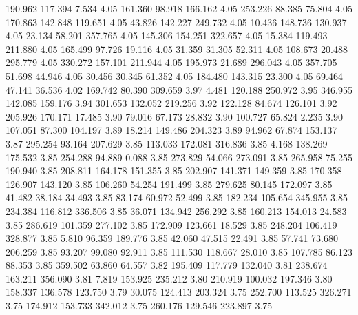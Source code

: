  190.962  117.394    7.534         4.05
 161.360   98.918  166.162         4.05
 253.226   88.385   75.804         4.05
 170.863  142.848  119.651         4.05
  43.826  142.227  249.732         4.05
  10.436  148.736  130.937         4.05
  23.134   58.201  357.765         4.05
 145.306  154.251  322.657         4.05
  15.384  119.493  211.880         4.05
 165.499   97.726   19.116         4.05
  31.359   31.305   52.311         4.05
 108.673   20.488  295.779         4.05
 330.272  157.101  211.944         4.05
 195.973   21.689  296.043         4.05
 357.705   51.698   44.946         4.05
  30.456   30.345   61.352         4.05
 184.480  143.315   23.300         4.05
  69.464   47.141   36.536         4.02
 169.742   80.390  309.659         3.97
   4.481  120.188  250.972         3.95
 346.955  142.085  159.176         3.94
 301.653  132.052  219.256         3.92
 122.128   84.674  126.101         3.92
 205.926  170.171   17.485         3.90
  79.016   67.173   28.832         3.90
 100.727   65.824    2.235         3.90
 107.051   87.300  104.197         3.89
  18.214  149.486  204.323         3.89
  94.962   67.874  153.137         3.87
 295.254   93.164  207.629         3.85
 113.033  172.081  316.836         3.85
   4.168  138.269  175.532         3.85
 254.288   94.889    0.088         3.85
 273.829   54.066  273.091         3.85
 265.958   75.255  190.940         3.85
 208.811  164.178  151.355         3.85
 202.907  141.371  149.359         3.85
 170.358  126.907  143.120         3.85
 106.260   54.254  191.499         3.85
 279.625   80.145  172.097         3.85
  41.482   38.184   34.493         3.85
  83.174   60.972   52.499         3.85
 182.234  105.654  345.955         3.85
 234.384  116.812  336.506         3.85
  36.071  134.942  256.292         3.85
 160.213  154.013   24.583         3.85
 286.619  101.359  277.102         3.85
 172.909  123.661   18.529         3.85
 248.204  106.419  328.877         3.85
   5.810   96.359  189.776         3.85
  42.060   47.515   22.491         3.85
  57.741   73.680  206.259         3.85
  93.207   99.080   92.911         3.85
 111.530  118.667   28.010         3.85
 107.785   86.123   88.353         3.85
 359.502   63.860   64.557         3.82
 195.409  117.779  132.040         3.81
 238.674  163.211  356.090         3.81
   7.819  153.925  235.212         3.80
 210.919  100.032  197.346         3.80
 158.337  136.578  123.750         3.79
  30.075  124.413  203.324         3.75
 252.700  113.525  326.271         3.75
 174.912  153.733  342.012         3.75
 260.176  129.546  223.897         3.75
